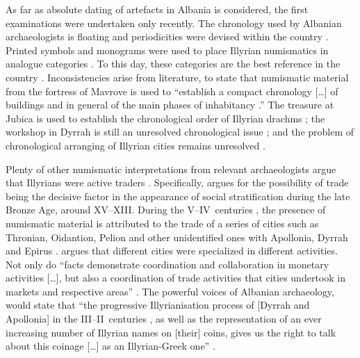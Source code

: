 	As far as absolute dating of artefacts in Albania is considered, the first examinations were undertaken only recently. The chronology used by Albanian archaeologists is floating and periodicities were devised within the country \parencite[271]{Aliu1985}. Printed symbols and monograms were used to place Illyrian numismatics in analogue categories \parencite[369]{Ceka1974}. To this day, these categories are the best reference in the country \parencite[242]{Sasianu1987}. Inconsistencies arise from literature, to state that numismatic material from the fortress of Mavrove is used to ``establish a compact chronology [\ldots] of buildings and in general of the main phases of inhabitancy \parencite[trans.][65]{Dautaj1981}.'' The treasure at Jubica is used to establish the chronological order of Illyrian drachms \parencite{Ceka1971}; the workshop in Dyrrah is still an unresolved chronological issue \parencite{Ceka1974}; and the problem of chronological arranging of Illyrian cities remains unresolved \parencites{Islami1972}{Islami2008}.
	

Plenty of other numismatic interpretations from relevant archaeologists argue that Illyrians were active traders \parencites{Mano1986}{Mano2006}{Ceka1965}{Ceka1974}{Gjongecaj1985}{Gjongecaj1986}{Gjongecaj1990}{Picard1986}{Picard1995}. Specifically, \textcite[94]{Prendi1985} argues for the possibility of trade being the decisive factor in the appearance of social stratification during the late Bronze Age, around XV--XIII\BC. During the V--IV\ centuries \BC, the presence of numismatic material is attributed to the trade of a series of cities such as Thronian, Oidantion, Pelion and other unidentified ones with Apollonia, Dyrrah and Epirus \parencite[112--113]{Prendi1974}. \textcite{Mano1974} argues that different cities were specialized in different activities. Not only do ``facts demonstrate coordination and collaboration in monetary activities [\ldots], but also a coordination of trade activities that cities undertook in markets and respective areas'' \parencite[trans.][388]{Mano1974}. The powerful voices of Albanian archaeology, would state that ``the progressive Illyrianisation process of [Dyrrah and Apollonia] in the III--II\ centuries \BC, as well as the representation of an ever increasing number of Illyrian names on [their] coins, gives us the right to talk about this coinage [\ldots] as an Illyrian-Greek one'' \parencite[trans.][164]{Stripceviq1980}.

